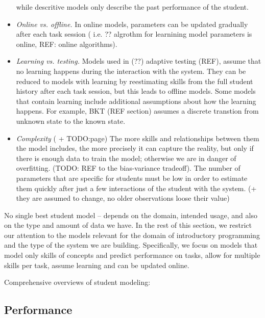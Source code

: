 \begin{itemize}
while descritive models only describe the past performance of the student.
\item \emph{Online vs. offline.}
In online models, parameters can be updated gradually after each task session
( i.e. ?? algrothm for learnining model parameters is online, REF: online algorithms).
\item \emph{Learning vs. testing.}
Models used in (??) adaptive testing (REF), assume that no learning happens
during the interaction with the system. They can be reduced to models with
learning by reestimating skills from the full student history after each task
session, but this leads to offline models.
Some models that contain learning include additional assumptions
about how the learning happens. For example, BKT (REF section)
assumes a discrete transtion from unknown state to the known state.
\item \emph{Complexity} (\cite{pelanek-learner-modeling} + TODO:page)
The more skills and relationships between them the model includes,
the more precisely it can capture the reality, but only
if there is enough data to train the model; otherwise we are in danger of
overfitting. (TODO: REF to the bias-variance tradeoff).
The number of parameters that are specific for students must be low in order to
estimate them quickly after just a few interactions of the student with the system.
(+ they are assumed to change, no older observations loose their value)
\end{itemize}

No single best student model -- depends on the domain, intended usage, and also
on the type and amount of data we have.
In the rest of this section, we restrict our attention to the models relevant
for the domain of introductory programming and the type of the system we
are building. Specifically, we focus on models that
model only skills of concepts and predict performance on tasks,
allow for multiple skills per task,
assume learning and can be updated online.

Comprehensive overviews of student modeling:
\cite{its-learner-models, student-models-review-2012, pelanek-learner-modeling}

\subsection{Performance}

